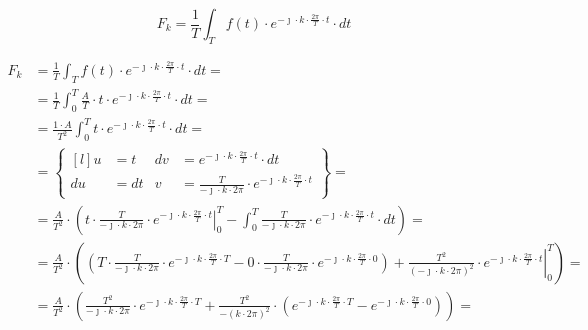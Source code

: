 \begin{task}


\begin{equation}
F_k=\frac{1}{T}\int_{T}f(t) \cdot e^{ -\jmath \cdot k \cdot \frac{2\pi}{T} \cdot t} \cdot dt
\end{equation}


\begin{align*}
F_k&=\frac{1}{T}\int_{T}f(t) \cdot e^{ -\jmath \cdot k \cdot \frac{2\pi}{T} \cdot t} \cdot dt=\\
&=\frac{1}{T}\int_{0}^{T} \frac{A}{T} \cdot t \cdot e^{ -\jmath \cdot k \cdot \frac{2\pi}{T} \cdot t} \cdot dt=\\
&=\frac{1\cdot A}{T^2}\int_{0}^{T} t \cdot e^{ -\jmath \cdot k \cdot \frac{2\pi}{T} \cdot t} \cdot dt=\\
&=\begin{Bmatrix*}[l]
u&=t & dv&=e^{ -\jmath \cdot k \cdot \frac{2\pi}{T} \cdot t} \cdot dt \\
du&=dt & v&=\frac{T}{-\jmath \cdot k\cdot 2\pi}\cdot e^{ -\jmath \cdot k \cdot \frac{2\pi}{T} \cdot t}
\end{Bmatrix*}=\\
&=\frac{A}{T^2}\cdot \left( \left. t \cdot \frac{T}{-\jmath \cdot k\cdot 2\pi}\cdot e^{ -\jmath \cdot k \cdot \frac{2\pi}{T} \cdot t} \right|_{0}^{T} - \int_{0}^{T}  \frac{T}{-\jmath \cdot k\cdot 2\pi}\cdot e^{ -\jmath \cdot k \cdot \frac{2\pi}{T} \cdot t} \cdot dt \right)=\\
&=\frac{A}{T^2}\cdot \left( \left( T \cdot \frac{T}{-\jmath \cdot k\cdot 2\pi}\cdot e^{ -\jmath \cdot k \cdot \frac{2\pi}{T} \cdot T} - 0 \cdot \frac{T}{-\jmath \cdot k\cdot 2\pi}\cdot e^{ -\jmath \cdot k \cdot \frac{2\pi}{T} \cdot 0} \right) + \left.  \frac{T^2}{\left(-\jmath \cdot k\cdot 2\pi\right)^2}\cdot e^{ -\jmath \cdot k \cdot \frac{2\pi}{T} \cdot t} \right|_{0}^{T} \right)=\\
&=\frac{A}{T^2}\cdot \left(\frac{T^2}{-\jmath \cdot k\cdot 2\pi}\cdot e^{ -\jmath \cdot k \cdot \frac{2\pi}{T} \cdot T} + \frac{T^2}{- \left(k\cdot 2\pi\right)^2}\cdot \left( e^{ -\jmath \cdot k \cdot \frac{2\pi}{T} \cdot T} - e^{ -\jmath \cdot k \cdot \frac{2\pi}{T} \cdot 0} \right) \right)=\\

\end{align*}
\end{task}
